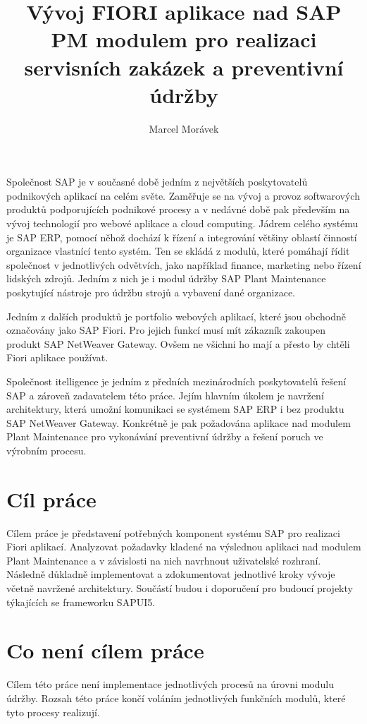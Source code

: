 \documentclass[thesis=M,czech]{FITthesis}[2012/06/26]
\title{Vývoj FIORI aplikace nad SAP PM modulem pro realizaci servisních zakázek a preventivní údržby}
\author{Marcel Morávek} %
\begin{document}

\begin{introduction}
Společnost SAP je v současné době jedním z největších poskytovatelů podnikových aplikací na celém světe. Zaměřuje se na vývoj a provoz softwarových produktů podporujících podnikové procesy a v nedávné době pak především na vývoj technologií pro webové aplikace a cloud computing. Jádrem celého systému je SAP ERP, pomocí něhož dochází k řízení a integrování většiny oblastí činností organizace vlastnící tento systém. Ten se skládá z modulů, které pomáhají řídit společnost v jednotlivých odvětvích, jako například finance, marketing nebo řízení lidských zdrojů. Jedním z nich je i modul údržby SAP Plant Maintenance poskytující nástroje pro údržbu strojů a vybavení dané organizace. 

Jedním z dalších produktů je portfolio webových aplikací, které jsou obchodně označovány jako SAP Fiori. Pro jejich funkcí musí mít zákazník zakoupen produkt SAP NetWeaver Gateway. Ovšem  ne všichni ho mají a přesto by chtěli Fiori aplikace používat.

Společnost itelligence je jedním z předních mezinárodních poskytovatelů řešení SAP a zároveň zadavatelem této práce. Jejím hlavním úkolem je navržení architektury, která umožní komunikaci se systémem SAP ERP i bez produktu SAP NetWeaver Gateway. Konkrétně je pak požadována aplikace nad modulem Plant Maintenance pro vykonávání preventivní údržby a řešení poruch ve výrobním procesu. 

\section{Cíl práce}
Cílem práce je představení potřebných komponent systému SAP pro realizaci Fiori aplikací. Analyzovat požadavky kladené na výslednou aplikaci nad modulem Plant Maintenance a v závislosti na nich navrhnout uživatelské rozhraní. Následně důkladně implementovat a zdokumentovat jednotlivé kroky vývoje včetně navržené architektury. Součástí budou i doporučení pro budoucí projekty týkajících se frameworku SAPUI5.

\section{Co není cílem práce}
Cílem této práce není implementace jednotlivých procesů na úrovni modulu údržby. Rozsah této práce končí voláním jednotlivých funkčních modulů, které tyto procesy realizují. 


\end{introduction}
\end{document}
